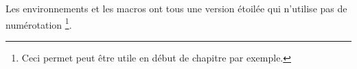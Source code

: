 Les environnements et les macros ont tous une version étoilée qui n'utilise pas de numérotation
\footnote{
	Ceci permet peut être utile en début de chapitre par exemple. 
}.